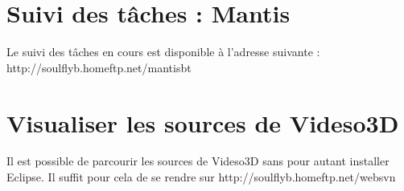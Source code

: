 \documentclass[a4paper, titlepage]{article}
\begin{document}
\section{Suivi des tâches : Mantis}

Le suivi des tâches en cours est disponible à l'adresse suivante :
http://soulflyb.homeftp.net/mantisbt

\section{Visualiser les sources de Videso3D}
Il est possible de parcourir les sources de Videso3D sans pour autant installer
Eclipse. Il suffit pour cela de se rendre sur http://soulflyb.homeftp.net/websvn
\end{document}
